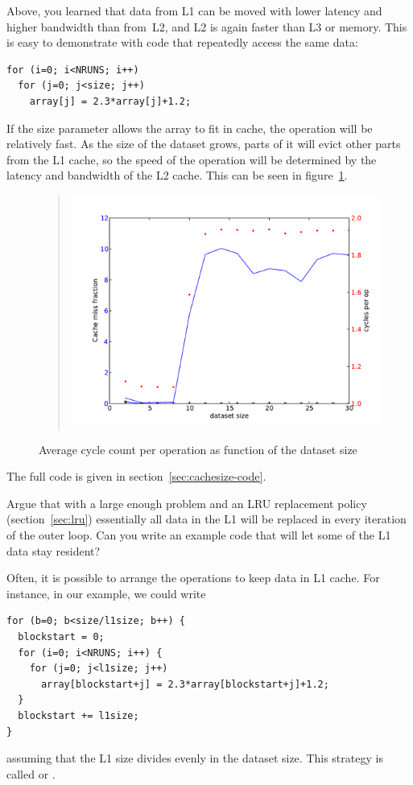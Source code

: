 Above, you learned that data from L1 can be moved with lower latency
and higher bandwidth than from~L2, and L2 is again faster than L3 or
memory. This is easy to demonstrate with code that repeatedly access
the same data:
\begin{verbatim}
for (i=0; i<NRUNS; i++)
  for (j=0; j<size; j++)
    array[j] = 2.3*array[j]+1.2;
\end{verbatim}
If the size parameter allows the array to fit in cache, the operation
will be relatively fast. As the size of the dataset grows, parts of it
will evict other parts from the L1 cache, so the speed of the
operation will be determined by the latency and bandwidth of the L2
cache. This can be seen in figure~\ref{fig:cache-overflow}.
\begin{figure}[ht]
  \begin{quote}
  \includegraphics[scale=.5]{graphics-public/cacheoverflow}
  \end{quote}
  \caption{Average cycle count per operation as function of the
    dataset size}
  \label{fig:cache-overflow}
\end{figure}
The full code is given in section~\ref{sec:cachesize-code}.

\begin{exercise}
  Argue that with a large enough problem and an \ac{LRU} replacement policy
  (section~\ref{sec:lru}) essentially all data in the L1 will be
  replaced in every iteration of the outer loop. Can you write an
  example code that will let some of the L1 data stay resident?
\end{exercise}

Often, it is possible to arrange the operations to keep data in L1
cache. For instance, in our example, we could write
\begin{verbatim}
for (b=0; b<size/l1size; b++) {
  blockstart = 0;
  for (i=0; i<NRUNS; i++) {
    for (j=0; j<l1size; j++)
      array[blockstart+j] = 2.3*array[blockstart+j]+1.2; 
  }
  blockstart += l1size;
}
\end{verbatim}
assuming that the L1 size divides evenly in the dataset size.
This strategy is called  or
.

